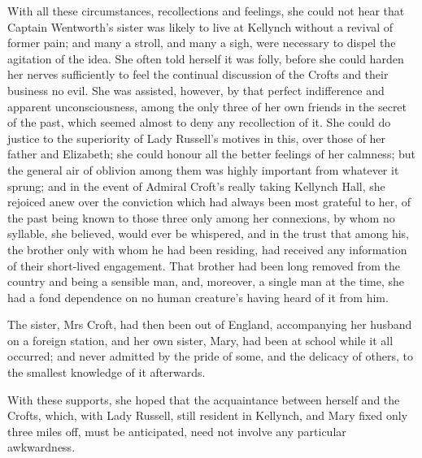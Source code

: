 With all these circumstances, recollections and feelings, she could not hear that Captain Wentworth's sister was likely to live at Kellynch without a revival of former pain; and many a stroll, and many a sigh, were necessary to dispel the agitation of the idea. She often told herself it was folly, before she could harden her nerves sufficiently to feel the continual discussion of the Crofts and their business no evil. She was assisted, however, by that perfect indifference and apparent unconsciousness, among the only three of her own friends in the secret of the past, which seemed almost to deny any recollection of it. She could do justice to the superiority of Lady Russell's motives in this, over those of her father and Elizabeth; she could honour all the better feelings of her calmness; but the general air of oblivion among them was highly important from whatever it sprung; and in the event of Admiral Croft's really taking Kellynch Hall, she rejoiced anew over the conviction which had always been most grateful to her, of the past being known to those three only among her connexions, by whom no syllable, she believed, would ever be whispered, and in the trust that among his, the brother only with whom he had been residing, had received any information of their short-lived engagement. That brother had been long removed from the country and being a sensible man, and, moreover, a single man at the time, she had a fond dependence on no human creature's having heard of it from him.

The sister, Mrs Croft, had then been out of England, accompanying her husband on a foreign station, and her own sister, Mary, had been at school while it all occurred; and never admitted by the pride of some, and the delicacy of others, to the smallest knowledge of it afterwards.

With these supports, she hoped that the acquaintance between herself and the Crofts, which, with Lady Russell, still resident in Kellynch, and Mary fixed only three miles off, must be anticipated, need not involve any particular awkwardness.